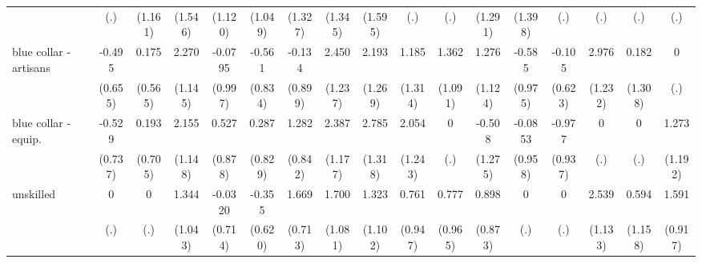 {\begin{tabular}{l*{16}{c}}
                    &         (.)         &     (1.161)         &     (1.546)         &     (1.120)         &     (1.049)         &     (1.327)         &     (1.345)         &     (1.595)         &         (.)         &         (.)         &     (1.291)         &     (1.398)         &         (.)         &         (.)         &         (.)         &         (.)         \\
[1em]
blue collar - artisans&      -0.495         &       0.175         &       2.270\sym{*}  &     -0.0795         &      -0.561         &      -0.134         &       2.450\sym{*}  &       2.193         &       1.185         &       1.362         &       1.276         &      -0.585         &      -0.105         &       2.976\sym{*}  &       0.182         &           0         \\
                    &     (0.655)         &     (0.565)         &     (1.145)         &     (0.997)         &     (0.834)         &     (0.899)         &     (1.237)         &     (1.269)         &     (1.314)         &     (1.091)         &     (1.124)         &     (0.975)         &     (0.623)         &     (1.232)         &     (1.308)         &         (.)         \\
[1em]
blue collar - equip.&      -0.529         &       0.193         &       2.155         &       0.527         &       0.287         &       1.282         &       2.387\sym{*}  &       2.785\sym{*}  &       2.054         &           0         &      -0.508         &     -0.0853         &      -0.977         &           0         &           0         &       1.273         \\
                    &     (0.737)         &     (0.705)         &     (1.148)         &     (0.878)         &     (0.829)         &     (0.842)         &     (1.177)         &     (1.318)         &     (1.243)         &         (.)         &     (1.275)         &     (0.958)         &     (0.937)         &         (.)         &         (.)         &     (1.192)         \\
[1em]
unskilled           &           0         &           0         &       1.344         &     -0.0320         &      -0.355         &       1.669\sym{*}  &       1.700         &       1.323         &       0.761         &       0.777         &       0.898         &           0         &           0         &       2.539\sym{*}  &       0.594         &       1.591         \\
                    &         (.)         &         (.)         &     (1.043)         &     (0.714)         &     (0.620)         &     (0.713)         &     (1.081)         &     (1.102)         &     (0.947)         &     (0.965)         &     (0.873)         &         (.)         &         (.)         &     (1.133)         &     (1.158)         &     (0.917)         \\

\end{tabular}}
